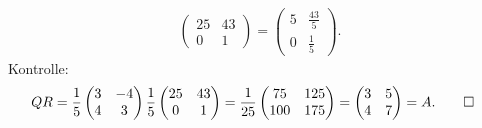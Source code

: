\begin{loesung}
\begin{align*}
\begin{pmatrix}
25&43\\
 0&1
\end{pmatrix}
=\begin{pmatrix}
5&\frac{43}{5}\\
0&\frac{1}{5}
\end{pmatrix}.
\end{align*}
Kontrolle:
\begin{align*}
QR&=\frac15\begin{pmatrix}3&-4\\4&3\end{pmatrix}\frac15\begin{pmatrix}25&43\\0&1\end{pmatrix}
=\frac1{25}\begin{pmatrix}75&125\\100&175\end{pmatrix}
=\begin{pmatrix}3&5\\4&7\end{pmatrix}=A.
\qedhere
\end{align*}
\end{loesung}
